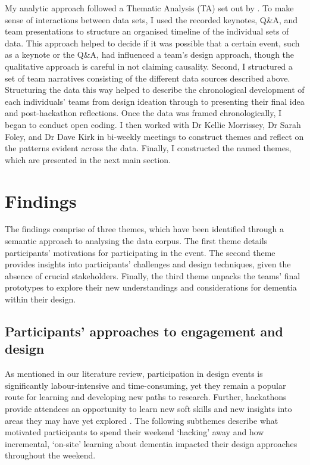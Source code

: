 My analytic approach followed a Thematic Analysis (TA) set out by \cite{braun_one_2020,braun_using_2006}. To make sense of interactions between data sets, I used the recorded keynotes, Q\&A, and team presentations to structure an organised timeline of the individual sets of data. This approach helped to decide if it was possible that a certain event, such as a keynote or the Q\&A, had influenced a team's design approach, though the qualitative approach is careful in not claiming causality. Second, I structured a set of team narratives consisting of the different data sources described above. Structuring the data this way helped to describe the chronological development of each individuals’ teams from design ideation through to presenting their final idea and post-hackathon reflections.  Once the data was framed chronologically, I began to conduct open coding. I then worked with Dr Kellie Morrissey, Dr Sarah Foley, and Dr Dave Kirk in bi-weekly meetings to construct themes and reflect on the patterns evident across the data. Finally, I constructed the named themes, which are presented in the next main section. 

\section{Findings}
\label{sec:Findings}
The findings comprise of three themes, which have been identified through a semantic approach to analysing the data corpus. The first theme details participants’ motivations for participating in the event. The second theme provides insights into participants' challenges and design techniques, given the absence of crucial stakeholders. Finally, the third theme unpacks the teams’ final prototypes to explore their new understandings and considerations for dementia within their design.
\subsection{Participants' approaches to engagement and design}
\label{LearningEvent:ThemeOne}
As mentioned in our literature review, participation in design events is significantly labour-intensive and time-consuming, yet they remain a popular route for learning and developing new paths to research. Further, hackathons provide attendees an opportunity to learn new soft skills and new insights into areas they may have yet explored \citep{medina_angarita_what_2020}. The following subthemes describe what motivated participants to spend their weekend ‘hacking’ away and how incremental, ‘on-site’ learning about dementia impacted their design approaches throughout the weekend. 

